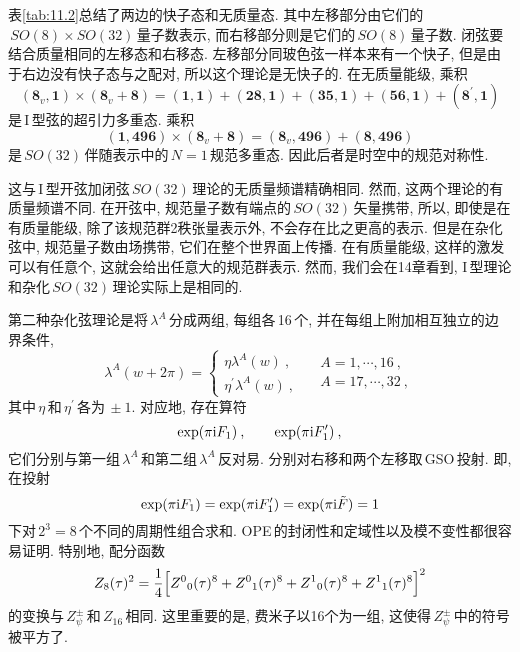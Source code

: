 表\ref{tab:11.2}总结了两边的快子态和无质量态. 其中左移部分由它们的$\,SO(8)\times SO(32)\,$量子数表示, 而右移部分则是它们的$\,SO(8)\,$量子数. 闭弦要结合质量相同的左移态和右移态. 左移部分同玻色弦一样本来有一个快子, 但是由于右边没有快子态与之配对, 所以这个理论是无快子的. 在无质量能级, 乘积
\begin{equation}
    (\mathbf{8}_{v},\mathbf{1})\times (\mathbf{8}_{v}+\mathbf{8}) =
    (\mathbf{1},\mathbf{1})+(\mathbf{28},\mathbf{1})+(\mathbf{35},\mathbf{1})+(\mathbf{56},\mathbf{1})+(\mathbf{8}^{\prime},\mathbf{1})\label{11.2.17}
\end{equation}
是\,I\,型弦的超引力多重态. 乘积
\begin{equation}
    (\mathbf{1},\mathbf{496})\times (\mathbf{8}_{v}+\mathbf{8}) = (\mathbf{8}_{v},\mathbf{496}) + (\mathbf{8},\mathbf{496})\label{11.2.18}
\end{equation}
是$\,SO(32)\,$伴随表示中的\,$N=1$\,规范多重态. 因此后者是时空中的规范对称性.

这与\,I\,型开弦加闭弦\,$SO(32)\,$理论的无质量频谱精确相同. 然而, 这两个理论的有质量频谱不同. 在开弦中, 规范量子数有端点的$\,SO(32)\,$矢量携带, 所以, 即使是在有质量能级, 除了该规范群2秩张量表示外, 不会存在比之更高的表示. 但是在杂化弦中, 规范量子数由场携带, 它们在整个世界面上传播. 在有质量能级, 这样的激发可以有任意个, 这就会给出任意大的规范群表示. 然而, 我们会在14章看到, I\,型理论和杂化$\,SO(32)\,$理论实际上是相同的.

第二种杂化弦理论是将$\,\lambda^{A}\,$分成两组, 每组各\,16\,个, 并在每组上附加相互独立的边界条件,
\begin{equation}
    \lambda^{A}(w+2\pi) = \left\{
    \begin{array}{l}
         \eta \lambda^{A}(w) \: ,\\
         \eta^{\prime} \lambda^{A}(w) \:, 
    \end{array} \quad 
    \begin{array}{l}
         A=1,\cdots,16\:,  \\
         A=17,\cdots,32 \:, 
    \end{array}
    \right. \label{11.2.19}
\end{equation}
其中$\,\eta\,$和$\,\eta^{\prime}\,$各为$\,\pm1$. 对应地, 存在算符
\begin{equation}
    \exp(\pi\mathrm{i} F_{1}) \:, \qquad \exp(\pi\mathrm{i} F_{1}^{\prime}) \:, \label{11.2.20} 
\end{equation}
它们分别与第一组$\,\lambda^{A}\,$和第二组$\,\lambda^{A}\,$反对易. 分别对右移和两个左移取\,GSO\,投射. 即, 在投射
\begin{equation}
    \exp(\pi\mathrm{i} F_{1}) =\exp (\pi\mathrm{i} F_{1}^{\prime}) =\exp(\pi\mathrm{i} \tilde{F}) = 1  \label{11.2.21}
\end{equation}
下对$\,2^{3}=8\,$个不同的周期性组合求和. OPE\,的封闭性和定域性以及模不变性都很容易证明. 特别地, 配分函数
\begin{equation}
    Z_{8}(\tau)^{2} = \frac{1}{4} \Bigl[Z^{0}{}_{0}(\tau)^{8} + Z^{0}{}_{1}(\tau)^{8}
    +Z^{1}{}_{0}(\tau)^{8} + Z^{1}{}_{1}(\tau)^{8} \Bigr]^{2} \label{11.2.22}
\end{equation}
的变换与\,$Z_{\psi}^{\pm}$\,和$\,Z_{16}\,$相同. 这里重要的是, 费米子以16个为一组, 这使得$\,Z_{\psi}^{\pm}\,$中的符号被平方了.

